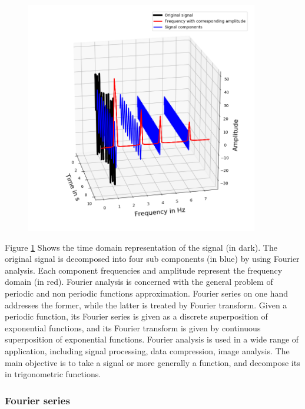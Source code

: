 \documentclass[11pt, oneside]{article}   	%
\begin{document}
\begin{figure}[H] %
   \centering
   \includegraphics[width=4in]{fft_domain} 
   \caption{}
   \label{fig:pro}
\end{figure}
\justify
Figure \ref{fig:pro} Shows the time domain representation of the signal (in dark). The original signal is decomposed into four sub components (in blue) by using Fourier analysis. Each component frequencies and amplitude represent the frequency domain (in red). 
\justify
Fourier analysis is concerned with the general problem of periodic and non periodic functions approximation. Fourier series on one hand addresses the former, while the latter is treated by Fourier transform. Given a periodic function, its Fourier series is given as a discrete superposition of exponential functions, and its Fourier transform is given by continuous superposition of exponential functions.
\justify
Fourier analysis is used in a wide range of application, including signal processing, data compression, image analysis. The main objective is to take a signal or more generally a function, and decompose its in trigonometric functions. 
\subsubsection{Fourier series}
\end{document}
